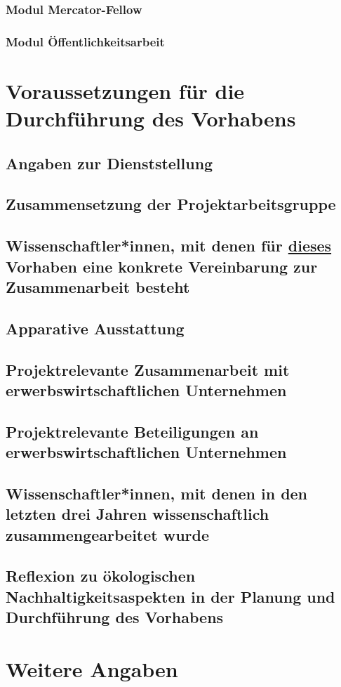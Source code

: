 \documentclass[german, 53.02]{proposal}
\begin{document}
\subsubsection{Modul Mercator-Fellow}

\subsubsection{Modul Öffentlichkeitsarbeit}


\section{Voraussetzungen für die Durchführung des Vorhabens}

\subsection{Angaben zur Dienststellung}

\subsection{Zusammensetzung der Projektarbeitsgruppe}

\subsection{Wissenschaftler*innen, mit denen für \underline{dieses} Vorhaben eine konkrete Vereinbarung zur Zusammenarbeit besteht}

\subsection{Apparative Ausstattung}

\subsection{Projektrelevante Zusammenarbeit mit erwerbswirtschaftlichen Unternehmen}

\subsection{Projektrelevante Beteiligungen an erwerbswirtschaftlichen Unternehmen}

\subsection{Wissenschaftler*innen, mit denen in den letzten drei Jahren wissenschaftlich zusammengearbeitet wurde}

\subsection{Reflexion zu ökologischen Nachhaltigkeitsaspekten in der Planung und Durchführung des Vorhabens}


\section{Weitere Angaben}
\end{document}
